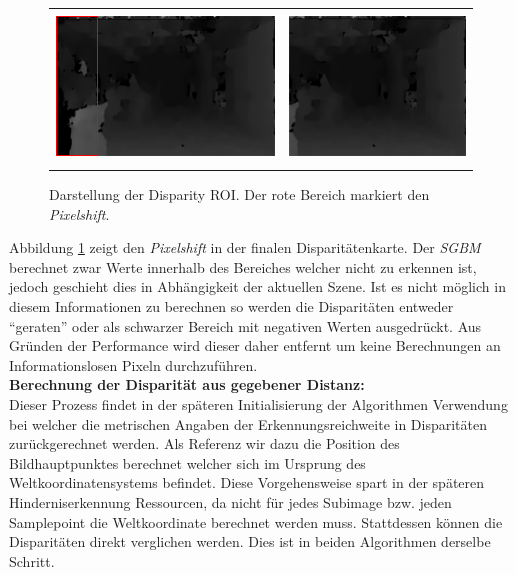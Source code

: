 	\begin{figure}[h]
		\centering
		\begin{tabular}{cc}
			\includegraphics[height=4cm]{img/evaluation/dmap_noroi} &
			\includegraphics[height=4cm]{img/evaluation/dmap_roi}
		\end{tabular}
		\caption{Darstellung der Disparity ROI. Der rote Bereich markiert den \emph{Pixelshift}.}
		\label{fig:dmap_roi}
	\end{figure}

\noindent
Abbildung \ref{fig:dmap_roi} zeigt den \emph{Pixelshift} in der finalen Disparitätenkarte. Der \emph{SGBM} berechnet zwar Werte innerhalb des Bereiches welcher nicht zu erkennen ist, jedoch geschieht dies in Abhängigkeit der aktuellen Szene. Ist es nicht möglich in diesem Informationen zu berechnen so werden die Disparitäten entweder \enquote{geraten} oder als schwarzer Bereich mit negativen Werten ausgedrückt. Aus Gründen der Performance wird dieser daher entfernt um keine Berechnungen an Informationslosen Pixeln durchzuführen.\\
	
\noindent
\textbf{Berechnung der Disparität aus gegebener Distanz:}\\
\noindent
Dieser Prozess findet in der späteren Initialisierung der Algorithmen Verwendung bei welcher die metrischen Angaben der Erkennungsreichweite in Disparitäten zurückgerechnet werden. Als Referenz wir dazu die Position des Bildhauptpunktes berechnet welcher sich im Ursprung des Weltkoordinatensystems befindet. Diese Vorgehensweise spart in der späteren Hinderniserkennung Ressourcen, da nicht für jedes Subimage bzw. jeden Samplepoint die Weltkoordinate berechnet werden muss. Stattdessen können die Disparitäten direkt verglichen werden. Dies ist in beiden Algorithmen derselbe Schritt.\\

